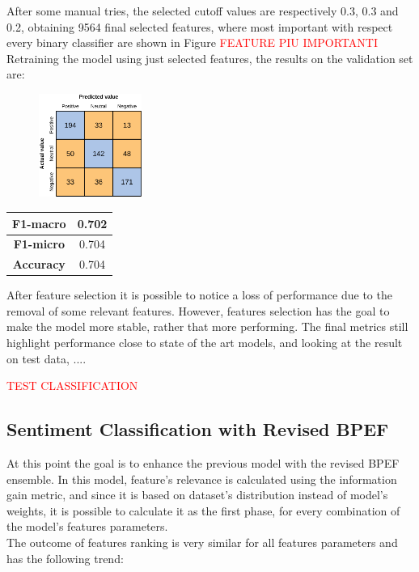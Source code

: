 After some manual tries, the selected cutoff values are respectively 0.3, 0.3 and 0.2, obtaining 9564 final selected features, where most important with respect every binary classifier are shown in Figure %
\textcolor{red}{FEATURE PIU IMPORTANTI}
 Retraining the model using just selected features, the results on the validation set are:
\begin{figure}[H]
	\centering
	\includegraphics[width=0.3\textwidth]{figures/conf_matrices/twitter_sent_svm/tw_snt_svm_afs.pdf}
	\label{fig:conf1}
\end{figure}

\begin{center}
	\begin{tabular}{ | c | c | } 
		\hline
		\textbf{F1-macro} & 0.702 \\
		\hline
		\textbf{F1-micro} & 0.704 \\ 
		\hline
		\textbf{Accuracy} & 0.704 \\ 
		\hline
	\end{tabular}
\end{center}

After feature selection it is possible to notice a loss of performance due to the removal of some relevant features. However, features selection has the goal to make the model more stable, rather that more performing. The final metrics still highlight performance close to state of the art models, and looking at the result on test data, .... %

\textcolor{red}{TEST CLASSIFICATION}


\subsection{Sentiment Classification with Revised BPEF}

At this point the goal is to enhance the previous model with the revised BPEF ensemble. In this model, feature's relevance is calculated using the information gain metric, and since it is based on dataset's distribution instead of model's weights, it is possible to calculate it as the first phase, for every combination of the model's features parameters.\\
The outcome of features ranking is very similar for all features parameters and has the following trend:

